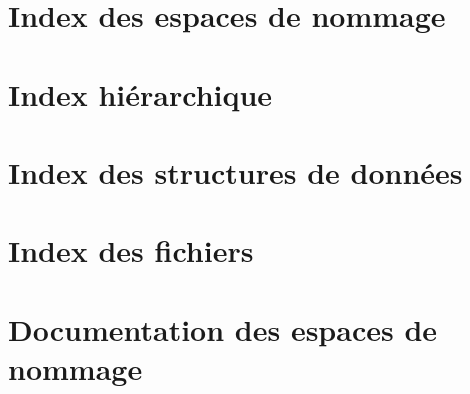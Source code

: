 \documentclass[twoside]{book}
\newcommand{\+}{\discretionary{\mbox{\scriptsize$\hookleftarrow$}}{}{}}
\begin{document}


























\chapter{Index des espaces de nommage}

\chapter{Index hiérarchique}

\chapter{Index des structures de données}

\chapter{Index des fichiers}

\chapter{Documentation des espaces de nommage}















\end{document}
